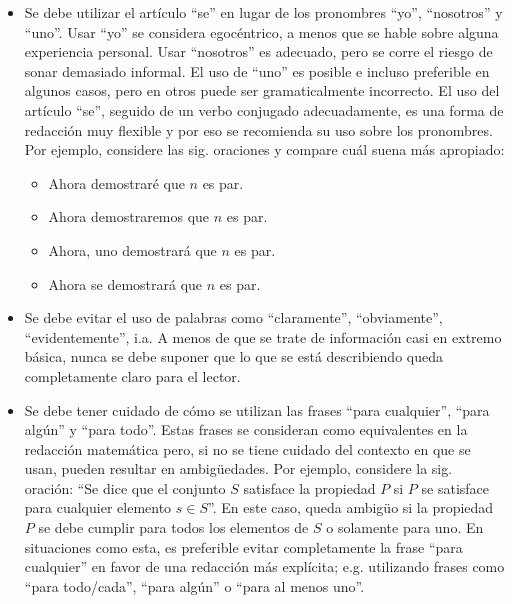 \begin{itemize}

    \item Se debe utilizar el artículo ``se'' en lugar de los pronombres ``yo'',
    ``nosotros'' y ``uno''. Usar ``yo'' se considera egocéntrico,
    a menos que se hable sobre alguna experiencia personal. Usar ``nosotros''
    es adecuado, pero se corre el riesgo de sonar demasiado informal. El
    uso de ``uno'' es posible e incluso preferible en algunos casos,
    pero en otros puede ser gramaticalmente incorrecto. El uso del artículo 
    ``se'', seguido de un verbo conjugado adecuadamente, es una forma de redacción 
    muy flexible y por eso se recomienda su uso sobre los pronombres. 
    Por ejemplo, considere las sig. oraciones y compare cuál suena más apropiado:
    
    \begin{itemize}
        \item Ahora demostraré que $n$ es par.
        \item Ahora demostraremos que $n$ es par.
        \item Ahora, uno demostrará que $n$ es par.
        \item Ahora se demostrará que $n$ es par.
    \end{itemize}
    
    \item Se debe evitar el uso de palabras como ``claramente'', ``obviamente'',
    ``evidentemente'', i.a. A menos de que se trate de información casi en extremo
    básica, nunca se debe suponer que lo que se está 
    describiendo queda completamente claro para el lector.
    
    \item Se debe tener cuidado de cómo se utilizan las frases ``para cualquier'',
    ``para algún'' y ``para todo''. Estas frases se consideran como
    equivalentes en la redacción matemática pero, si no se tiene
    cuidado del contexto en que se usan, pueden resultar en ambigüedades.
    Por ejemplo, considere la sig. oración: ``Se dice que el conjunto
    $S$ satisface la propiedad $P$ si $P$ se satisface para cualquier
    elemento $s\in S$''. En este caso, queda ambigüo si la propiedad
    $P$ se debe cumplir para todos los elementos de $S$ o solamente
    para uno. En situaciones como esta, es preferible evitar completamente
    la frase ``para cualquier'' en favor de una redacción más explícita;
    e.g. utilizando frases como ``para todo/cada'', ``para algún''
    o ``para al menos uno''.
    

\end{itemize}
